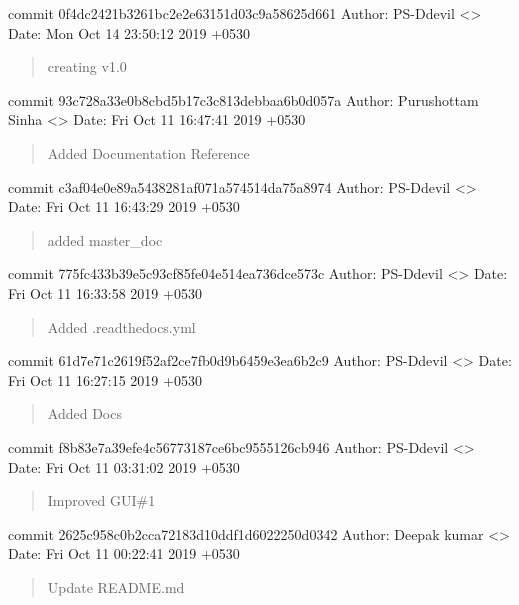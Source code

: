 \documentclass[letterpaper,10pt,english]{sphinxmanual}
\begin{document}
commit 0f4dc2421b3261bc2e2e63151d03c9a58625d661
Author: PS-Ddevil \textless{}\textgreater{}
Date:   Mon Oct 14 23:50:12 2019 +0530
\begin{quote}

creating v1.0
\end{quote}

commit 93c728a33e0b8cbd5b17c3c813debbaa6b0d057a
Author: Purushottam Sinha \textless{}\textgreater{}
Date:   Fri Oct 11 16:47:41 2019 +0530
\begin{quote}

Added Documentation Reference
\end{quote}

commit c3af04e0e89a5438281af071a574514da75a8974
Author: PS-Ddevil \textless{}\textgreater{}
Date:   Fri Oct 11 16:43:29 2019 +0530
\begin{quote}

added master\_doc
\end{quote}

commit 775fc433b39e5c93cf85fe04e514ea736dce573c
Author: PS-Ddevil \textless{}\textgreater{}
Date:   Fri Oct 11 16:33:58 2019 +0530
\begin{quote}

Added .readthedocs.yml
\end{quote}

commit 61d7e71c2619f52af2ce7fb0d9b6459e3ea6b2c9
Author: PS-Ddevil \textless{}\textgreater{}
Date:   Fri Oct 11 16:27:15 2019 +0530
\begin{quote}

Added Docs
\end{quote}

commit f8b83e7a39efe4c56773187ce6bc9555126cb946
Author: PS-Ddevil \textless{}\textgreater{}
Date:   Fri Oct 11 03:31:02 2019 +0530
\begin{quote}

Improved GUI\#1
\end{quote}

commit 2625c958c0b2cca72183d10ddf1d6022250d0342
Author: Deepak kumar \textless{}\textgreater{}
Date:   Fri Oct 11 00:22:41 2019 +0530
\begin{quote}

Update README.md
\end{quote}
\end{document}
